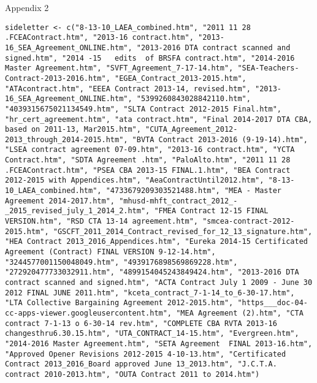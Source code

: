\begin{center}
Appendix 2
\end{center}

\begin{lstlisting}
sideletter <- c("8-13-10_LAEA_combined.htm", "2011 11 28 .FCEAContract.htm", "2013-16 contract.htm", "2013-16_SEA_Agreement_ONLINE.htm", "2013-2016 DTA contract scanned and signed.htm", "2014 -15   edits  of BRSFA contract.htm", "2014-2016 Master Agreement.htm", "SVFT_Agreement_7-17-14.htm", "SEA-Teachers-Contract-2013-2016.htm", "EGEA_Contract_2013-2015.htm", "ATAcontract.htm", "EEEA Contract 2013-14, revised.htm", "2013-16_SEA_Agreement_ONLINE.htm", "5399260843028842110.htm", "4039315675021134549.htm", "SLTA Contract 2012-2015 Final.htm", "hr_cert_agreement.htm", "ata contract.htm", "Final 2014-2017 DTA CBA, based on 2011-13, Mar2015.htm", "CUTA_Agreement_2012-2013_through_2014-2015.htm", "BVTA Contract 2013-2016 (9-19-14).htm", "LSEA contract agreement 07-09.htm", "2013-16 contract.htm", "YCTA Contract.htm", "SDTA Agreement .htm", "PaloAlto.htm", "2011 11 28 .FCEAContract.htm", "PSEA CBA 2013-15 FINAL.1.htm", "BEA Contract 2012-2015 with Appendices.htm", "AeaContractUntil2012.htm", "8-13-10_LAEA_combined.htm", "4733679209303521488.htm", "MEA - Master Agreement 2014-2017.htm", "mhusd-mhft_contract_2012_-_2015_revised_july_1_2014_2.htm", "FMEA Contract 12-15 FINAL VERSION.htm", "RSD CTA 13-14 agreement.htm", "smcea-contract-2012-2015.htm", "GSCFT_2011_2014_Contract_revised_for_12_13_signature.htm", "HEA Contract 2013_2016_Appendices.htm", "Eureka 2014-15 Certificated Agreement (Contract) FINAL VERSION 9-12-14.htm", "3244577001150048049.htm", "4939176898569869228.htm", "272920477733032911.htm", "4899154045243849424.htm", "2013-2016 DTA contract scanned and signed.htm", "ACTA Contract July 1 2009 - June 30 2012 FINAL JUNE 2011.htm", "kceta_contract_7-1-14_to_6-30-17.htm", "LTA Collective Bargaining Agreement 2012-2015.htm", "https___doc-04-cc-apps-viewer.googleusercontent.htm", "MEA Agreement (2).htm", "CTA contract 7-1-13 o 6-30-14 rev.htm", "COMPLETE CBA RVTA 2013-16 changesthru6.30.15.htm", "UTA_CONTRACT_14-15.htm", "Evergreen.htm", "2014-2016 Master Agreement.htm", "SETA Agreement  FINAL 2013-16.htm", "Approved Opener Revisions 2012-2015 4-10-13.htm", "Certificated Contract 2013_2016_Board approved June 13_2013.htm", "J.C.T.A. contract 2010-2013.htm", "OUTA Contract 2011 to 2014.htm")
\end{lstlisting}